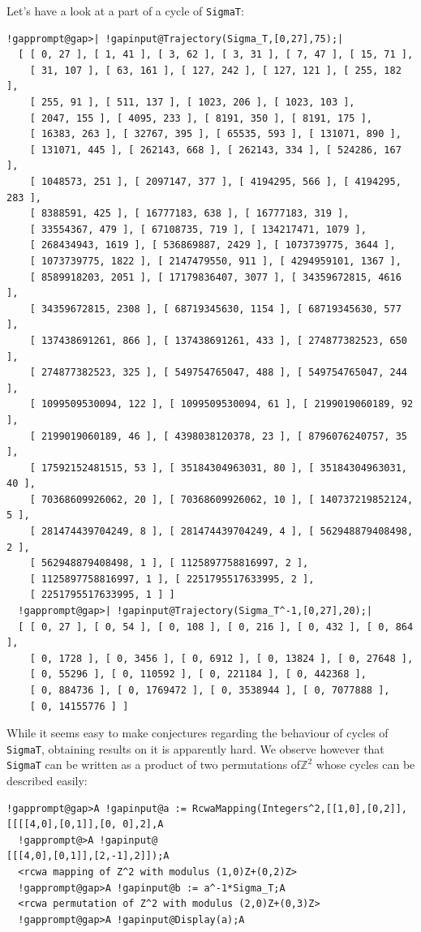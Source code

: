 \documentclass[a4paper,11pt]{report}
\begin{document}
{{ Let's have a look at a part of a cycle of \texttt{Sigma{\textunderscore}T}: 
\begin{Verbatim}[commandchars=!@|,fontsize=\small,frame=single,label=Example]
  !gapprompt@gap>| !gapinput@Trajectory(Sigma_T,[0,27],75);|
  [ [ 0, 27 ], [ 1, 41 ], [ 3, 62 ], [ 3, 31 ], [ 7, 47 ], [ 15, 71 ], 
    [ 31, 107 ], [ 63, 161 ], [ 127, 242 ], [ 127, 121 ], [ 255, 182 ], 
    [ 255, 91 ], [ 511, 137 ], [ 1023, 206 ], [ 1023, 103 ], 
    [ 2047, 155 ], [ 4095, 233 ], [ 8191, 350 ], [ 8191, 175 ], 
    [ 16383, 263 ], [ 32767, 395 ], [ 65535, 593 ], [ 131071, 890 ], 
    [ 131071, 445 ], [ 262143, 668 ], [ 262143, 334 ], [ 524286, 167 ], 
    [ 1048573, 251 ], [ 2097147, 377 ], [ 4194295, 566 ], [ 4194295, 283 ], 
    [ 8388591, 425 ], [ 16777183, 638 ], [ 16777183, 319 ], 
    [ 33554367, 479 ], [ 67108735, 719 ], [ 134217471, 1079 ], 
    [ 268434943, 1619 ], [ 536869887, 2429 ], [ 1073739775, 3644 ], 
    [ 1073739775, 1822 ], [ 2147479550, 911 ], [ 4294959101, 1367 ], 
    [ 8589918203, 2051 ], [ 17179836407, 3077 ], [ 34359672815, 4616 ], 
    [ 34359672815, 2308 ], [ 68719345630, 1154 ], [ 68719345630, 577 ], 
    [ 137438691261, 866 ], [ 137438691261, 433 ], [ 274877382523, 650 ], 
    [ 274877382523, 325 ], [ 549754765047, 488 ], [ 549754765047, 244 ], 
    [ 1099509530094, 122 ], [ 1099509530094, 61 ], [ 2199019060189, 92 ], 
    [ 2199019060189, 46 ], [ 4398038120378, 23 ], [ 8796076240757, 35 ], 
    [ 17592152481515, 53 ], [ 35184304963031, 80 ], [ 35184304963031, 40 ], 
    [ 70368609926062, 20 ], [ 70368609926062, 10 ], [ 140737219852124, 5 ], 
    [ 281474439704249, 8 ], [ 281474439704249, 4 ], [ 562948879408498, 2 ], 
    [ 562948879408498, 1 ], [ 1125897758816997, 2 ], 
    [ 1125897758816997, 1 ], [ 2251795517633995, 2 ], 
    [ 2251795517633995, 1 ] ]
  !gapprompt@gap>| !gapinput@Trajectory(Sigma_T^-1,[0,27],20);|
  [ [ 0, 27 ], [ 0, 54 ], [ 0, 108 ], [ 0, 216 ], [ 0, 432 ], [ 0, 864 ], 
    [ 0, 1728 ], [ 0, 3456 ], [ 0, 6912 ], [ 0, 13824 ], [ 0, 27648 ], 
    [ 0, 55296 ], [ 0, 110592 ], [ 0, 221184 ], [ 0, 442368 ], 
    [ 0, 884736 ], [ 0, 1769472 ], [ 0, 3538944 ], [ 0, 7077888 ], 
    [ 0, 14155776 ] ]
\end{Verbatim}
 While it seems easy to make conjectures regarding the behaviour of cycles of \texttt{Sigma{\textunderscore}T}, obtaining results on it is apparently hard. We observe however that \texttt{Sigma{\textunderscore}T} can be written as a product of two permutations of{\nobreakspace}${\ensuremath{\mathbb Z}}^2$ whose cycles can be described easily: 
\begin{Verbatim}[commandchars=!@A,fontsize=\small,frame=single,label=Example]
  !gapprompt@gap>A !gapinput@a := RcwaMapping(Integers^2,[[1,0],[0,2]],[[[[4,0],[0,1]],[0, 0],2],A
  !gapprompt@>A !gapinput@                                              [[[4,0],[0,1]],[2,-1],2]]);A
  <rcwa mapping of Z^2 with modulus (1,0)Z+(0,2)Z>
  !gapprompt@gap>A !gapinput@b := a^-1*Sigma_T;A
  <rcwa permutation of Z^2 with modulus (2,0)Z+(0,3)Z>
  !gapprompt@gap>A !gapinput@Display(a);A
  

\end{Verbatim}}}
\end{document}
